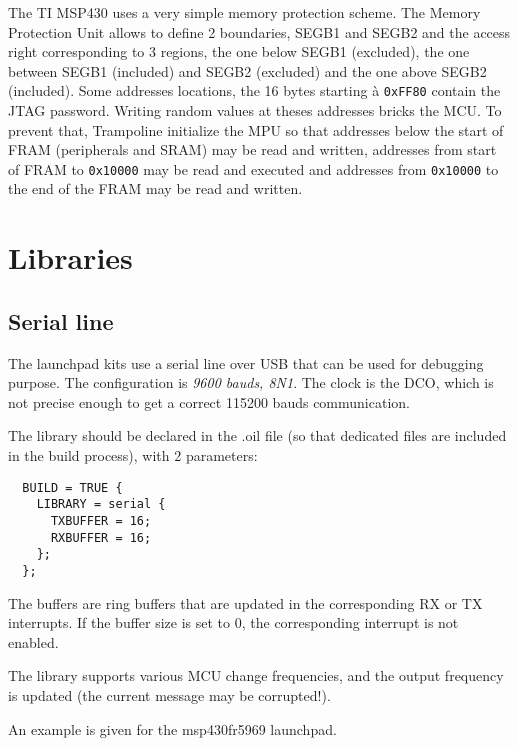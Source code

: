 \documentclass[11pt, oneside]{article}   	%
\begin{document}
The TI MSP430 uses a very simple memory protection scheme. The Memory Protection Unit allows to define 2 boundaries, SEGB1 and SEGB2 and the access right corresponding to 3 regions, the one below SEGB1 (excluded), the one between SEGB1 (included) and SEGB2 (excluded) and the one above SEGB2 (included). Some addresses locations, the 16 bytes starting à \lstinline{0xFF80} contain the JTAG password. Writing random values at theses addresses bricks the MCU. To prevent that, Trampoline initialize the MPU so that addresses below the start of FRAM (peripherals and SRAM) may be read and written, addresses from start of FRAM to \lstinline{0x10000} may be read and executed and addresses from \lstinline{0x10000} to the end of the FRAM may be read and written.

\section{Libraries}
\subsection{Serial line}
The launchpad kits use a serial line over USB that can be used for debugging purpose. The configuration is \emph{9600 bauds, 8N1}. The clock is the DCO, which is not precise enough to get a correct 115200 bauds communication.

The library should be declared in the .oil file (so that dedicated files are included in the build process), with 2 parameters:
\begin{lstlisting}
  BUILD = TRUE {
    LIBRARY = serial {
      TXBUFFER = 16;
      RXBUFFER = 16;
    };
  };
\end{lstlisting}

The buffers are ring buffers that are updated in the corresponding RX or TX interrupts. If the buffer size is set to 0, the corresponding interrupt is not enabled.

The library supports various MCU change frequencies, and the output frequency is updated (the current message may be corrupted!).

An example is given for the msp430fr5969 launchpad.


\end{document}
